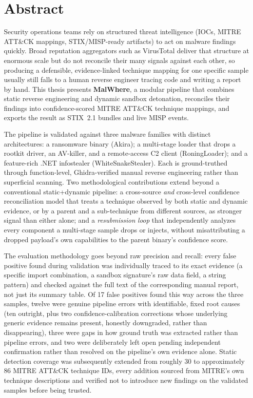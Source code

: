 \section*{Abstract}

Security operations teams rely on structured threat intelligence
(IOCs, MITRE ATT\&CK mappings, STIX/MISP-ready artifacts) to act on
malware findings quickly. Broad reputation aggregators such as
VirusTotal deliver that structure at enormous scale but do not
reconcile their many signals against each other, so producing a
defensible, evidence-linked technique mapping for one specific sample
usually still falls to a human reverse engineer tracing code and
writing a report by hand. This thesis presents \textbf{MalWhere}, a
modular pipeline that combines static reverse engineering and dynamic
sandbox detonation, reconciles their findings into confidence-scored
MITRE ATT\&CK technique mappings, and exports the result as STIX~2.1
bundles and live MISP events.

The pipeline is validated against three malware families with
distinct architectures: a ransomware binary (Akira); a multi-stage
loader that drops a rootkit driver, an AV-killer, and a remote-access
C2 client (RoningLoader); and a feature-rich .NET infostealer
(WhiteSnakeStealer). Each is ground-truthed through function-level,
Ghidra-verified manual reverse engineering rather than superficial
scanning. Two methodological contributions extend beyond a
conventional static+dynamic pipeline: a cross-source \emph{and}
cross-level confidence reconciliation model that treats a technique
observed by both static and dynamic evidence, or by a parent and a
sub-technique from different sources, as stronger signal than either
alone; and a \emph{resubmission loop} that independently analyzes
every component a multi-stage sample drops or injects, without
misattributing a dropped payload's own capabilities to the parent
binary's confidence score.

The evaluation methodology goes beyond raw precision and recall: every
false positive found during validation was individually traced to its
exact evidence (a specific import combination, a sandbox signature's
raw data field, a string pattern) and checked against the full text of
the corresponding manual report, not just its summary table. Of 17
false positives found this way across the three samples, twelve were
genuine pipeline errors with identifiable, fixed root causes (ten
outright, plus two confidence-calibration corrections whose underlying
generic evidence remains present, honestly downgraded, rather than
disappearing), three were gaps in how ground truth was extracted rather
than pipeline errors, and two were deliberately left open pending
independent confirmation rather than resolved on the pipeline's own
evidence alone. Static detection coverage was subsequently extended
from roughly 30 to approximately 86 MITRE ATT\&CK technique IDs, every
addition sourced from MITRE's own technique descriptions and verified
not to introduce new findings on the validated samples before being
trusted.

